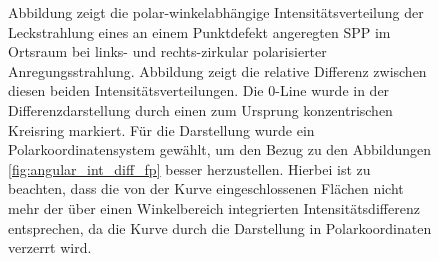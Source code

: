 \documentclass[titlepage,  ngerman]{article}
\begin{document}
\begin{figure}
			\caption{Abbildung  zeigt die polar-winkelabhängige Intensitätsverteilung der Leckstrahlung eines an einem Punktdefekt angeregten SPP im Ortsraum bei links- und rechts-zirkular polarisierter Anregungsstrahlung. Abbildung  zeigt die relative Differenz zwischen diesen beiden Intensitätsverteilungen. Die $0$-Line wurde in der Differenzdarstellung durch einen zum Ursprung konzentrischen Kreisring markiert. Für die Darstellung wurde ein Polarkoordinatensystem gewählt, um den Bezug zu den Abbildungen \ref{fig:angular_int_diff_fp} besser herzustellen. Hierbei ist zu beachten, dass die von der Kurve eingeschlossenen Flächen nicht mehr der über einen Winkelbereich integrierten Intensitätsdifferenz entsprechen, da die Kurve durch die Darstellung in Polarkoordinaten verzerrt wird.}
			\label{fig:angular_dist_fp}
		\end{figure}
	
		\FloatBarrier
\end{document}
